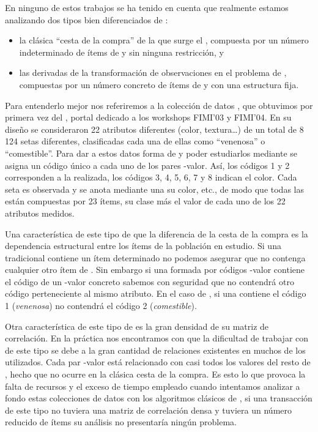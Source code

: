 En ninguno de estos trabajos se ha tenido en cuenta que realmente estamos analizando dos tipos bien diferenciados de \transacciones:
\begin{itemize}
  \item la clásica "`cesta de la compra"' de la que surge el \ARM, compuesta por un número indeterminado de ítems de \I y sin ninguna restricción, y
  \item las \transacciones derivadas de la transformación de observaciones en el problema de \Clasificacion, compuestas por un número concreto de ítems de \I y con una estructura fija.
\end{itemize}

Para entenderlo mejor nos referiremos a la colección de datos \mushroom, que obtuvimos por primera vez del , portal dedicado a los workshops FIMI'03 y FIMI'04. En su diseño se consideraron 22 atributos diferentes (color, textura\ldots) de un total de 8\,124 setas diferentes, clasificadas cada una de ellas como "`venenosa"' o "`comestible"'. Para dar a estos datos forma de \transaccion y poder estudiarlos mediante \ARM se asigna un código único a cada uno de los pares \atributo-valor. Así, los códigos 1 y 2 corresponden a la \clasificacion realizada, los códigos 3, 4, 5, 6, 7 y 8 indican el color. Cada seta es observada y se anota mediante una \transaccion su color, etc., de modo que todas las \transacciones están compuestas por 23 ítems, su clase más el valor de cada uno de los 22 atributos medidos.

Una característica de este tipo de \transaccion que la diferencia de la cesta de la compra es la dependencia estructural entre los ítems de la población en estudio. Si una \transaccion tradicional contiene un ítem determinado no podemos asegurar que no contenga cualquier otro ítem de \I. Sin embargo si una \transaccion formada por códigos \atributo-valor contiene el código de un \atributo-valor concreto sabemos con seguridad que no contendrá otro código perteneciente al mismo atributo. En el caso de \mushroom, si una \transaccion contiene el código 1 (\emph{venenosa}) no contendrá el código 2 (\emph{comestible}).

Otra característica de este tipo de \transacciones es la gran densidad de su matriz de correlación. En la práctica nos encontramos con que la dificultad de trabajar con \transacciones de este tipo se debe a la gran cantidad de relaciones existentes en muchos de los \datasets utilizados. Cada par \atributo-valor está relacionado con casi todos los valores del resto de \atributos, hecho que no ocurre en la clásica cesta de la compra. Es esto lo que provoca la falta de recursos y el exceso de tiempo empleado cuando intentamos analizar a fondo estas colecciones de datos con los algoritmos clásicos de \ARM, si una transacción de este tipo no tuviera una matriz de correlación densa y tuviera un número reducido de ítems su análisis no presentaría ningún problema.

